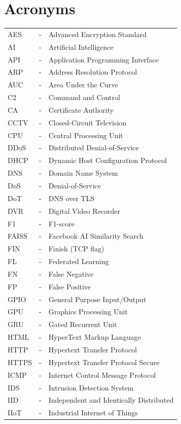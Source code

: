 \chapter*{Acronyms}

\noindent \begin{longtable}{lcl}
AES	& - & Advanced Encryption Standard\\
AI	& - & Artificial Intelligence\\
API	& - & Application Programming Interface\\
ARP	& - & Address Resolution Protocol\\
AUC	& - & Area Under the Curve\\
C2	& - & Command and Control\\
CA	& - & Certificate Authority\\
CCTV	& - & Closed-Circuit Television\\
CPU	& - & Central Processing Unit\\
DDoS	& - & Distributed Denial-of-Service\\
DHCP	& - & Dynamic Host Configuration Protocol\\
DNS	& - & Domain Name System\\
DoS	& - & Denial-of-Service\\
DoT	& - & DNS over TLS\\
DVR	& - & Digital Video Recorder\\
F1	& - & F1-score\\
FAISS	& - & Facebook AI Similarity Search\\
FIN	& - & Finish (TCP flag)\\
FL	& - & Federated Learning\\
FN	& - & False Negative\\
FP	& - & False Positive\\
GPIO	& - & General Purpose Input/Output\\
GPU	& - & Graphics Processing Unit\\
GRU	& - & Gated Recurrent Unit\\
HTML	& - & HyperText Markup Language\\
HTTP	& - & Hypertext Transfer Protocol\\
HTTPS	& - & Hypertext Transfer Protocol Secure\\
ICMP	& - & Internet Control Message Protocol\\
IDS	& - & Intrusion Detection System\\
IID	& - & Independent and Identically Distributed\\
IIoT	& - & Industrial Internet of Things\\

\end{longtable}
